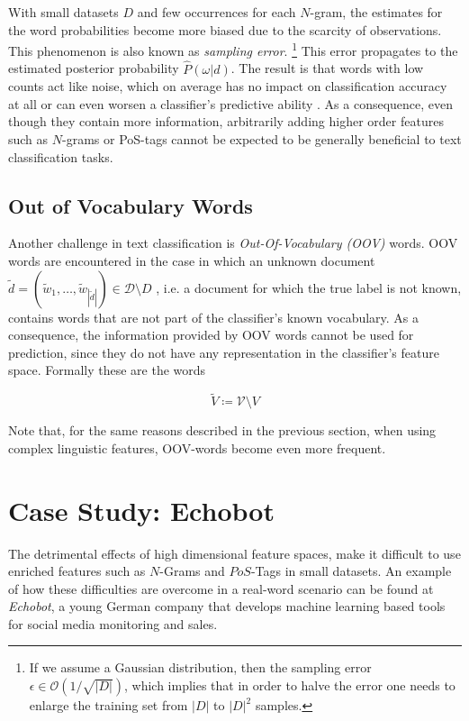 With small datasets $D$ and few occurrences for each $N$-gram, the estimates for the word probabilities
become more biased due to the scarcity of observations. This phenomenon is also
known as \emph{sampling error}. \footnote{If we assume a
Gaussian distribution, then the sampling error $\epsilon \in
\mathcal{O}(1/\sqrt{|D|})$, which implies that in order to halve the error one
needs to enlarge the training set from $|D|$ to $|D|^2$ samples.} This error
propagates to the estimated posterior probability $\hat{P}(\omega|d)$.
The result is that words with low counts act like noise, which on average has no
impact on classification accuracy at all or can even worsen a classifier's
predictive ability \cite{saif2012alleviating}. As a consequence, even though they contain more
information, arbitrarily adding higher order features such as $N$-grams or
PoS-tags cannot be expected to be generally beneficial to text classification
tasks. 
\subsection{Out of Vocabulary Words}
\label{ssec:oov}

Another challenge in text classification is \emph{Out-Of-Vocabulary
(OOV)} words. OOV words are encountered in the case in which an unknown document
$\tilde{d} = (\tilde{w}_1, \ldots, \tilde{w}_{|\tilde{d}|}) \in
\mathcal{D}\setminus D$ , i.e.
a document for which the true label is not known, contains words that are not
part of the classifier's known vocabulary.
As a consequence, the information provided by OOV words cannot be used for
prediction, since they do not have any representation in the classifier's feature
space. Formally these are the words

\begin{equation*}
\tilde{V} \coloneqq \mathcal{V} \setminus V
\end{equation*}

Note that, for the same reasons described in the previous section, when using
complex linguistic features, OOV-words become even more frequent.

\section{Case Study: Echobot}
\label{sec:echobot}

The detrimental effects of high dimensional feature spaces, make it difficult to
use enriched features such as $N$-Grams and $PoS$-Tags in small datasets.
An example of how these difficulties are overcome in a real-word scenario
can be found at \textit{Echobot}, a young German company that develops machine
learning based tools for social media monitoring and sales.

